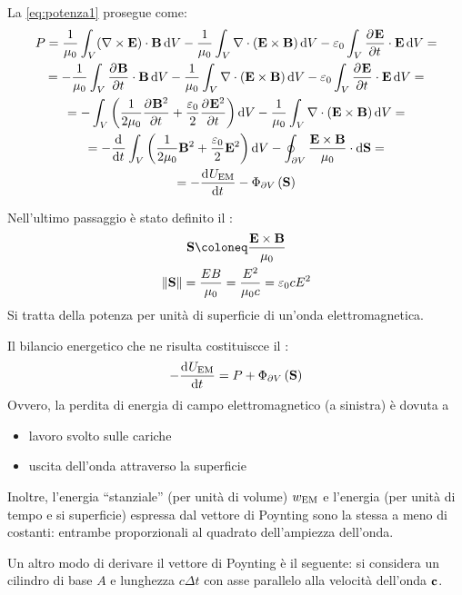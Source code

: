 La \eqref{eq:potenza1} prosegue come:
\begin{equation}
\begin{gathered}
    P = \frac{1}{\mu_0} \int_V (\curl \E) \cdot \B \,\de V
    - \frac{1}{\mu_0} \int_V \diver (\E \times \B) \,\de V
    - \eps_0 \int_V \parder[\E]{t} \cdot \E \,\de V = \\
    = - \frac{1}{\mu_0} \int_V \parder[\B]{t} \cdot \B \,\de V
    - \frac{1}{\mu_0} \int_V \diver (\E \times \B) \,\de V
    - \eps_0 \int_V \parder[\E]{t} \cdot \E \,\de V = \\
    = - \int_V \pts{\frac{1}{2 \mu_0} \parder[\B^2]{t} + \frac{\eps_0}{2} \parder[\E^2]{t}} \de V
    - \frac{1}{\mu_0} \int_V \diver (\E \times \B) \,\de V = \\
    = - \der{t} \int_V \pts{\frac{1}{2 \mu_0} \B^2 + \frac{\eps_0}{2} \E^2} \de V
    - \oint_{\partial V} \frac{\E \times \B}{\mu_0} \sde = \\
    = -\der[U\EM]{t} - \flux{\partial V}{\poy}
\end{gathered}
\end{equation}

Nell'ultimo passaggio è stato definito il :
\begin{gather}
    \poy \coloneq \frac{\E \times \B}{\mu_0} \\
    \norm{\poy} = \frac{E B}{\mu_0} = \frac{E^2}{\mu_0 c} = \eps_0 c E^2
\end{gather}
Si tratta della potenza per unità di superficie di un'onda elettromagnetica.

Il bilancio energetico che ne risulta costituiscce il :
\begin{gather}
    -\der[U\EM]{t} = P + \flux{\partial V}{\poy}
\end{gather}
Ovvero, la perdita di energia di campo elettromagnetico (a sinistra) è dovuta a
\begin{itemize}
    \item lavoro svolto sulle cariche
    \item uscita dell'onda attraverso la superficie
\end{itemize}

Inoltre, l'energia ``stanziale'' (per unità di volume) $w_\mathrm{EM}$ e l'energia (per unità di tempo e si superficie) espressa dal vettore di Poynting sono la stessa a meno di costanti: entrambe proporzionali al quadrato dell'ampiezza dell'onda.

Un altro modo di derivare il vettore di Poynting è il seguente: si considera un cilindro di base $A$ e lunghezza $c \Delta t$ con asse parallelo alla velocità dell'onda $\mathbf{c}$.

